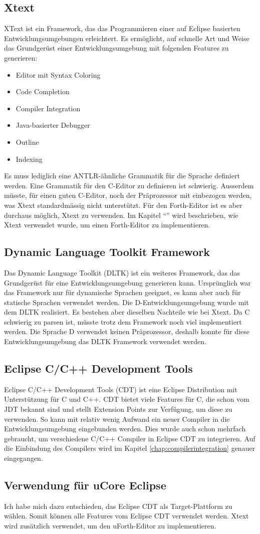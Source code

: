 \subsection{Xtext}
XText ist ein Framework, das das Programmieren einer auf Eclipse basierten Entwicklungsumgebungen erleichtert. Es ermöglicht, auf schnelle Art und Weise das Grundgerüst einer Entwicklungsumgebung mit folgenden Features zu generieren:\cite{xtext}

\begin{itemize} 
	\item Editor mit Syntax Coloring
	\item Code Completion
	\item Compiler Integration
	\item Java-basierter Debugger
	\item Outline
	\item Indexing
\end{itemize}

Es muss lediglich eine ANTLR-ähnliche Grammatik für die Sprache definiert werden.\cite{antlr} Eine Grammatik für den C-Editor zu definieren ist schwierig. Ausserdem müsste, für einen guten C-Editor, noch der Präprozessor mit einbezogen werden, was Xtext standardmässig nicht unterstützt. \newline Für den Forth-Editor ist es aber durchaus möglich, Xtext zu verwenden. Im Kapitel "`"' wird beschrieben, wie Xtext verwendet wurde, um einen Forth-Editor zu implementieren.

\subsection{Dynamic Language Toolkit Framework}
Das Dynamic Language Toolkit (DLTK) ist ein weiteres Framework, das das Grundgerüst für eine Entwicklungsumgebung generieren kann. Ursprünglich war das Framework nur für dynamische Sprachen geeignet, es kann aber auch für statische Sprachen verwendet werden. Die D-Entwicklungsumgebung wurde mit dem DLTK realisiert\cite{ddt}. Es bestehen aber dieselben Nachteile wie bei Xtext. Da C schwierig zu parsen ist, müsste trotz dem Framework noch viel implementiert werden. Die Sprache D verwendet keinen Präprozessor, deshalb konnte für diese Entwicklungsumgebung das DLTK Framework verwendet werden.

\subsection{Eclipse C/C++ Development Tools}
Eclipse C/C++ Development Tools (CDT) ist eine Eclipse Distribution mit Unterstützung für C und C++. CDT bietet viele Features für C, die schon vom JDT bekannt sind und stellt Extension Points zur Verfügung, um diese zu verwenden. So kann mit relativ wenig Aufwand ein neuer Compiler in die Entwicklungsumgebung eingebunden werden. Dies wurde auch schon mehrfach gebraucht, um verschiedene C/C++ Compiler in Eclipse CDT zu integrieren. Auf die Einbindung des Compilers wird im Kapitel \ref{chap:compilerintegration} genauer eingegangen.

\subsection{Verwendung für uCore Eclipse}
Ich habe mich dazu entschieden, das Eclipse CDT als Target-Plattform zu wählen. Somit können alle Features vom Eclipse CDT verwendet werden. Xtext wird zusätzlich verwendet, um den uForth-Editor zu implementieren.
